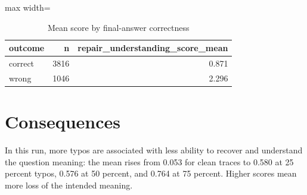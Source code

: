 \documentclass[11pt]{article}
\begin{document}
\begin{table}[H]
\centering
\caption{Mean score by final-answer correctness}
\small
\begin{adjustbox}{max width=\textwidth}
\begin{tabular}{lrr}
\toprule
\textbf{outcome} & \textbf{n} & \textbf{repair\_understanding\_score\_mean} \\
\midrule
correct & 3816 & 0.871 \\
wrong & 1046 & 2.296 \\
\bottomrule
\end{tabular}
\end{adjustbox}
\end{table}

\section*{Consequences} In this run, more typos are associated with less ability to recover and understand the question meaning: the mean rises from 0.053 for clean traces to 0.580 at 25 percent typos, 0.576 at 50 percent, and 0.764 at 75 percent. Higher scores mean more loss of the intended meaning.
\end{document}
